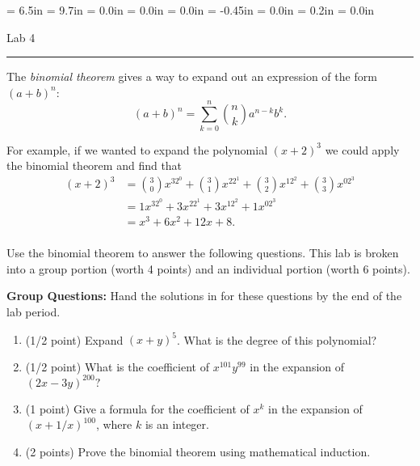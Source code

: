 \documentclass{article}
\begin{document}
\textwidth = 6.5in
\textheight = 9.7in
\oddsidemargin = 0.0in
\evensidemargin = 0.0in
\topmargin = 0.0in
\headheight = -0.45in
\headsep = 0.0in
\parskip = 0.2in
\parindent = 0.0in

\pagestyle{empty}


\centerline{Lab 4}

\noindent\rule{6.7in}{0.01in}

\vspace{0.2in}

The \textit{binomial theorem} gives a way to expand out an expression of the form $(a+b)^n$:
\[(a+b)^n=\sum_{k=0}^n\binom{n}{k}a^{n-k}b^k.\]

For example, if we wanted to expand the polynomial $(x+2)^3$ we could apply the binomial theorem and find that
\begin{align*}
(x+2)^3 &= \binom{3}{0}x^32^0+\binom{3}{1}x^22^1+\binom{3}{2}x^12^2+\binom{3}{3}x^02^3 \\
&= 1x^32^0+3x^22^1+3x^12^2+1x^02^3 \\
&= x^3+6x^2+12x+8. \\
\end{align*}


Use the binomial theorem to answer the following questions. This lab is broken into a group portion (worth 4 points) and an individual portion (worth 6 points).


\noindent\textbf{Group Questions:} Hand the solutions in for these questions by the end of the lab period.
\begin{enumerate}

\item (1/2 point) Expand $(x+y)^5$. What is the degree of this polynomial?

\vspace{0.2in}

\item (1/2 point) What is the coefficient of $x^{101}y^{99}$ in the expansion of $(2x-3y)^{200}?$

\vspace{0.2in}

\item (1 point) Give a formula for the coefficient of $x^k$ in the expansion of $(x+1/x)^{100}$, where $k$ is an integer.

\vspace{0.2in}

\item (2 points) Prove the binomial theorem using mathematical induction. 

\end{enumerate}
\end{document}
